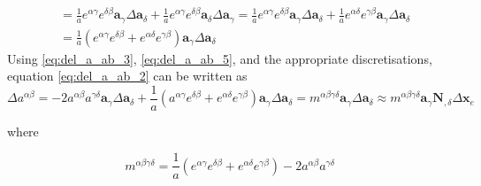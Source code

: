 \begin{equation}
\begin{split}
        &= \frac{1}{a} e^{\alpha \gamma} e^{\delta \beta} \boldsymbol{a}_{\gamma} \Delta \boldsymbol{a}_{\delta} + \frac{1}{a} e^{\alpha \gamma} e^{\delta \beta} \boldsymbol{a}_{\delta} \Delta \boldsymbol{a}_{\gamma} = \frac{1}{a} e^{\alpha \gamma} e^{\delta \beta} \boldsymbol{a}_{\gamma} \Delta \boldsymbol{a}_{\delta} + \frac{1}{a} e^{\alpha \delta} e^{\gamma \beta} \boldsymbol{a}_{\gamma} \Delta \boldsymbol{a}_{\delta} \\
        &= \frac{1}{a} \left( e^{\alpha \gamma} e^{\delta \beta} + e^{\alpha \delta} e^{\gamma \beta} \right) \boldsymbol{a}_{\gamma} \Delta \boldsymbol{a}_{\delta}
    \end{split}
\end{equation}
Using \eqref{eq:del_a_ab_3}, \eqref{eq:del_a_ab_5}, and the appropriate discretisations, equation \eqref{eq:del_a_ab_2} can be written as
\begin{equation}\label{eq:del_a_ab_6}
\Delta a^{\alpha \beta} = -2 a^{\alpha \beta} a^{\gamma \delta} \boldsymbol{a}_{\gamma} \Delta \boldsymbol{a}_{\delta} + \frac{1}{a} \left( a^{\alpha \gamma} e^{\delta \beta} + e^{\alpha \delta} e^{\gamma \beta} \right) \boldsymbol{a}_{\gamma} \Delta \boldsymbol{a}_{\delta} = m^{\alpha \beta \gamma \delta} \boldsymbol{a}_{\gamma} \Delta \boldsymbol{a}_{\delta} \approx m^{\alpha \beta \gamma \delta} \boldsymbol{a}_{\gamma} \mathbf{N}_{,\delta} \Delta \mathbf{x}_{e}
\end{equation}

where

\begin{equation}\label{eq:mabgd}
m^{\alpha \beta \gamma \delta} = \frac{1}{a} \left( e^{\alpha \gamma} e^{\delta \beta} + e^{\alpha \delta} e^{\gamma \beta} \right) - 2 a^{\alpha \beta} a^{\gamma \delta}
\end{equation}
